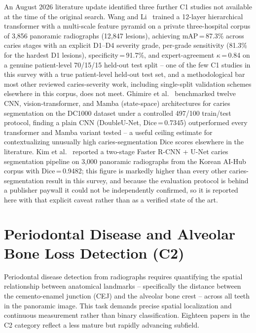 \documentclass[conference]{IEEEtran}
\begin{document}
An August 2026 literature update identified three further C1 studies not
available at the time of the original search. Wang and
Li~\cite{wang2026transformer} trained a 12-layer hierarchical
transformer with a multi-scale feature pyramid on a private
three-hospital corpus of 3,856 panoramic radiographs (12,847 lesions),
achieving mAP\,=\,87.3\% across caries stages with an explicit D1--D4
severity grade, per-grade sensitivity (81.3\% for the hardest D1
lesions), specificity\,=\,91.7\%, and expert-agreement
$\kappa$\,=\,0.84 on a genuine patient-level 70/15/15 held-out test
split -- one of the few C1 studies in this survey with a true
patient-level held-out test set, and a methodological bar most other
reviewed caries-severity work, including single-split validation
schemes elsewhere in this corpus, does not meet. Ghimire et
al.~\cite{ghimire2025cnns} benchmarked twelve CNN, vision-transformer,
and Mamba (state-space) architectures for caries segmentation on the
DC1000 dataset under a controlled 497/100 train/test protocol,
finding a plain CNN (DoubleU-Net, Dice\,=\,0.7345) outperformed every
transformer and Mamba variant tested -- a useful ceiling estimate for
contextualizing unusually high caries-segmentation Dice scores
elsewhere in the literature. Kim et al.~\cite{kim2026automated}
reported a two-stage Faster R-CNN + U-Net caries segmentation pipeline
on 3,000 panoramic radiographs from the Korean AI-Hub corpus with
Dice\,=\,0.9482; this figure is markedly higher than every other
caries-segmentation result in this survey, and because the evaluation
protocol is behind a publisher paywall it could not be independently
confirmed, so it is reported here with that explicit caveat rather than
as a verified state of the art.

\section{Periodontal Disease and Alveolar Bone Loss Detection (C2)}
\label{sec:perio}

Periodontal disease detection from radiographs requires quantifying the
spatial relationship between anatomical landmarks -- specifically the
distance between the cemento-enamel junction (CEJ) and the alveolar
bone crest -- across all teeth in the panoramic image. This task demands
precise spatial localization and continuous measurement rather than
binary classification. Eighteen papers in the C2 category reflect a
less mature but rapidly advancing subfield.
\end{document}
